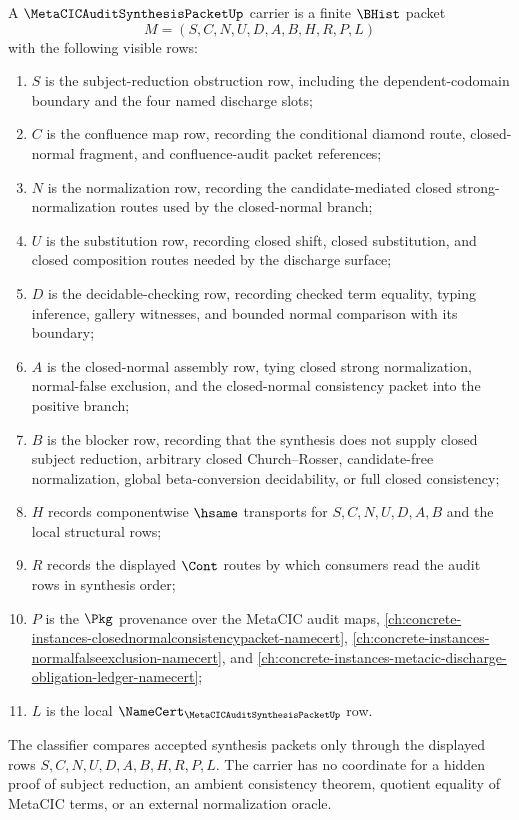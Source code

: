 \begin{definition}
\label{def:metacic-audit-synthesis-packet-carrier}
A $\MetaCICAuditSynthesisPacketUp$ carrier is a finite $\BHist$ packet
$$
M=(S,C,N,U,D,A,B,H,R,P,L)
$$
with the following visible rows:
\begin{enumerate}
\item $S$ is the subject-reduction obstruction row, including the dependent-codomain boundary and the four named discharge slots;
\item $C$ is the confluence map row, recording the conditional diamond route, closed-normal fragment, and confluence-audit packet references;
\item $N$ is the normalization row, recording the candidate-mediated closed strong-normalization routes used by the closed-normal branch;
\item $U$ is the substitution row, recording closed shift, closed substitution, and closed composition routes needed by the discharge surface;
\item $D$ is the decidable-checking row, recording checked term equality, typing inference, gallery witnesses, and bounded normal comparison with its boundary;
\item $A$ is the closed-normal assembly row, tying closed strong normalization, normal-false exclusion, and the closed-normal consistency packet into the positive branch;
\item $B$ is the blocker row, recording that the synthesis does not supply closed subject reduction, arbitrary closed Church--Rosser, candidate-free normalization, global beta-conversion decidability, or full closed consistency;
\item $H$ records componentwise $\hsame$ transports for $S,C,N,U,D,A,B$ and the local structural rows;
\item $R$ records the displayed $\Cont$ routes by which consumers read the audit rows in synthesis order;
\item $P$ is the $\Pkg$ provenance over the MetaCIC audit maps, \autoref{ch:concrete-instances-closednormalconsistencypacket-namecert}, \autoref{ch:concrete-instances-normalfalseexclusion-namecert}, and \autoref{ch:concrete-instances-metacic-discharge-obligation-ledger-namecert};
\item $L$ is the local $\NameCert_{\MetaCICAuditSynthesisPacketUp}$ row.
\end{enumerate}
The classifier compares accepted synthesis packets only through the displayed rows $S,C,N,U,D,A,B,H,R,P,L$. The carrier has no coordinate for a hidden proof of subject reduction, an ambient consistency theorem, quotient equality of MetaCIC terms, or an external normalization oracle.
\end{definition}

